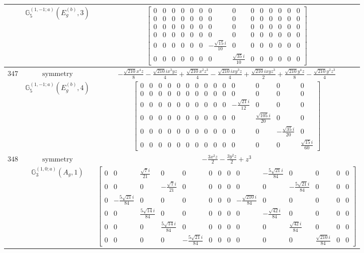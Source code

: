 \documentclass[fleqn,8pt,landscape]{jsarticle}
\begin{document}
\begin{longtable}{ccc}
$  $ & $ \mathbb{G}_{5}^{(1,-1;a)}(E_{g}^{(b)},3) $ & $ \begin{bmatrix} 0 & 0 & 0 & 0 & 0 & 0 & 0 & 0 & 0 & 0 & 0 & 0 & 0 & 0 \\ 0 & 0 & 0 & 0 & 0 & 0 & 0 & 0 & 0 & 0 & 0 & 0 & 0 & 0 \\ 0 & 0 & 0 & 0 & 0 & 0 & 0 & 0 & 0 & 0 & 0 & 0 & 0 & 0 \\ 0 & 0 & 0 & 0 & 0 & 0 & 0 & 0 & 0 & 0 & 0 & 0 & 0 & 0 \\ 0 & 0 & 0 & 0 & 0 & 0 & - \frac{\sqrt{15} i}{10} & 0 & 0 & 0 & 0 & 0 & 0 & 0 \\ 0 & 0 & 0 & 0 & 0 & 0 & 0 & \frac{\sqrt{35} i}{10} & 0 & 0 & 0 & 0 & 0 & 0 \end{bmatrix} $ \\ \hline
$ 347 $ & $ \text{symmetry} $ & $ - \frac{\sqrt{210} x^{4} z}{8} - \frac{\sqrt{210} i x^{3} y z}{4} + \frac{\sqrt{210} x^{2} z^{3}}{4} - \frac{\sqrt{210} i x y^{3} z}{4} + \frac{\sqrt{210} i x y z^{3}}{2} + \frac{\sqrt{210} y^{4} z}{8} - \frac{\sqrt{210} y^{2} z^{3}}{4} $ \\
$  $ & $ \mathbb{G}_{5}^{(1,-1;a)}(E_{g}^{(b)},4) $ & $ \begin{bmatrix} 0 & 0 & 0 & 0 & 0 & 0 & 0 & 0 & 0 & 0 & 0 & 0 & 0 & 0 \\ 0 & 0 & 0 & 0 & 0 & 0 & 0 & 0 & 0 & 0 & 0 & 0 & 0 & 0 \\ 0 & 0 & 0 & 0 & 0 & 0 & 0 & 0 & 0 & 0 & - \frac{\sqrt{21} i}{12} & 0 & 0 & 0 \\ 0 & 0 & 0 & 0 & 0 & 0 & 0 & 0 & 0 & 0 & 0 & \frac{\sqrt{105} i}{20} & 0 & 0 \\ 0 & 0 & 0 & 0 & 0 & 0 & 0 & 0 & 0 & 0 & 0 & 0 & - \frac{\sqrt{35} i}{20} & 0 \\ 0 & 0 & 0 & 0 & 0 & 0 & 0 & 0 & 0 & 0 & 0 & 0 & 0 & \frac{\sqrt{15} i}{60} \end{bmatrix} $ \\ \hline
$ 348 $ & $ \text{symmetry} $ & $ - \frac{3 x^{2} z}{2} - \frac{3 y^{2} z}{2} + z^{3} $ \\
$  $ & $ \mathbb{G}_{3}^{(1,0;a)}(A_{g},1) $ & $ \begin{bmatrix} 0 & 0 & \frac{\sqrt{7} i}{21} & 0 & 0 & 0 & 0 & 0 & 0 & - \frac{5 \sqrt{21} i}{84} & 0 & 0 & 0 & 0 \\ 0 & 0 & 0 & - \frac{\sqrt{7} i}{21} & 0 & 0 & 0 & 0 & 0 & 0 & - \frac{5 \sqrt{21} i}{84} & 0 & 0 & 0 \\ 0 & - \frac{5 \sqrt{21} i}{84} & 0 & 0 & 0 & 0 & 0 & 0 & - \frac{\sqrt{210} i}{84} & 0 & 0 & 0 & 0 & 0 \\ 0 & 0 & \frac{5 \sqrt{14} i}{84} & 0 & 0 & 0 & 0 & 0 & 0 & - \frac{\sqrt{42} i}{84} & 0 & 0 & 0 & 0 \\ 0 & 0 & 0 & \frac{5 \sqrt{14} i}{84} & 0 & 0 & 0 & 0 & 0 & 0 & \frac{\sqrt{42} i}{84} & 0 & 0 & 0 \\ 0 & 0 & 0 & 0 & - \frac{5 \sqrt{21} i}{84} & 0 & 0 & 0 & 0 & 0 & 0 & \frac{\sqrt{210} i}{84} & 0 & 0 \end{bmatrix} $ \\ \hline

\end{longtable}
\end{document}
